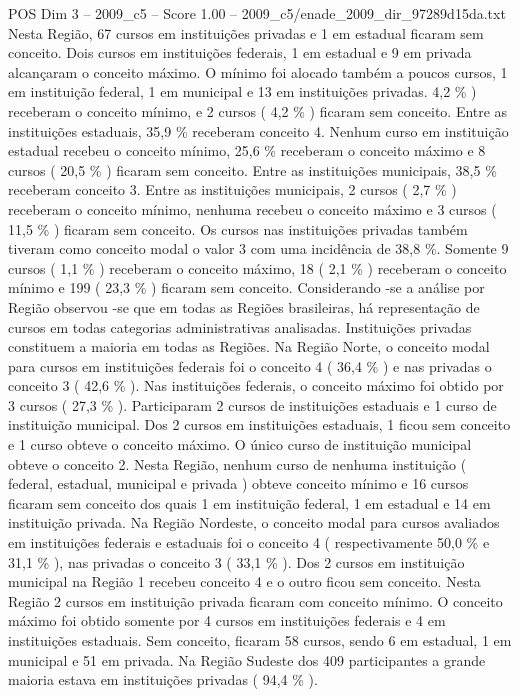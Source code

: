 \begin{textsample}{POS Dim 3 – 2009\_c5 – Score 1.00 – 2009\_c5/enade\_2009\_dir\_97289d15da.txt}
Nesta Região, 67 cursos em instituições privadas e 1 em estadual ficaram sem conceito.
Dois cursos em instituições federais, 1 em estadual e 9 em privada alcançaram o conceito máximo.
O mínimo foi alocado também a poucos cursos, 1 em instituição federal, 1 em municipal e 13 em instituições privadas. 4,2 \% ) receberam o conceito mínimo, e 2 cursos ( 4,2 \% ) ficaram sem conceito.
Entre as instituições estaduais, 35,9 \% receberam conceito 4.
Nenhum curso em instituição estadual recebeu o conceito mínimo, 25,6 \% receberam o conceito máximo e 8 cursos ( 20,5 \% ) ficaram sem conceito.
Entre as instituições municipais, 38,5 \% receberam conceito 3.
Entre as instituições municipais, 2 cursos ( 2,7 \% ) receberam o conceito mínimo, nenhuma recebeu o conceito máximo e 3 cursos ( 11,5 \% ) ficaram sem conceito.
Os cursos nas instituições privadas também tiveram como conceito modal o valor 3 com uma incidência de 38,8 \%.
Somente 9 cursos ( 1,1 \% ) receberam o conceito máximo, 18 ( 2,1 \% ) receberam o conceito mínimo e 199 ( 23,3 \% ) ficaram sem conceito.
Considerando -se a análise por Região observou -se que em todas as Regiões brasileiras, há representação de cursos em todas categorias administrativas analisadas.
Instituições privadas constituem a maioria em todas as Regiões.
Na Região Norte, o conceito modal para cursos em instituições federais foi o conceito 4 ( 36,4 \% ) e nas privadas o conceito 3 ( 42,6 \% ).
Nas instituições federais, o conceito máximo foi obtido por 3 cursos ( 27,3 \% ).
Participaram 2 cursos de instituições estaduais e 1 curso de instituição municipal.
Dos 2 cursos em instituições estaduais, 1 ficou sem conceito e 1 curso obteve o conceito máximo.
O único curso de instituição municipal obteve o conceito 2.
Nesta Região, nenhum curso de nenhuma instituição ( federal, estadual, municipal e privada ) obteve conceito mínimo e 16 cursos ficaram sem conceito dos quais 1 em instituição federal, 1 em estadual e 14 em instituição privada.
Na Região Nordeste, o conceito modal para cursos avaliados em instituições federais e estaduais foi o conceito 4 ( respectivamente 50,0 \% e 31,1 \% ), nas privadas o conceito 3 ( 33,1 \% ).
Dos 2 cursos em instituição municipal na Região 1 recebeu conceito 4 e o outro ficou sem conceito.
Nesta Região 2 cursos em instituição privada ficaram com conceito mínimo.
O conceito máximo foi obtido somente por 4 cursos em instituições federais e 4 em instituições estaduais.
Sem conceito, ficaram 58 cursos, sendo 6 em estadual, 1 em municipal e 51 em privada.
Na Região Sudeste dos 409 participantes a grande maioria estava em instituições privadas ( 94,4 \% ).

\end{textsample}
